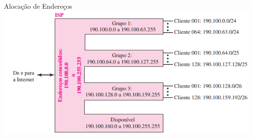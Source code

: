 \documentclass{libs/ufc_format}
\begin{document}
\begin{frame}{Alocação de Endereços}
    \includegraphics[scale=0.68]{figuras/figura09_05}
\end{frame}

\end{document}
